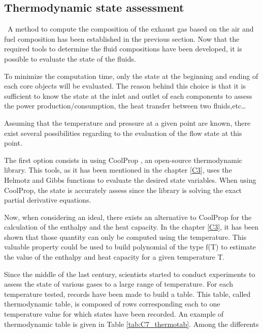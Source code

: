 \subsection{Thermodynamic state assessment}
\quad\ A method to compute the composition of the exhaust gas based on the air and fuel composition has been established in the previous section. Now that the required tools to determine the fluid compositions have been developed, it is possible to evaluate the state of the fluids. 

To minimize the computation time, only the state at the beginning and ending of each core objects will be evaluated. The reason behind this choice is that it is sufficient to know the state at the inlet and outlet of each components to assess the power production/consumption, the heat transfer between two fluids,etc\dots

Assuming that the temperature and pressure at a given point are known, there exist several possibilities regarding to the evaluation of the flow state at this point. 

The first option consists in using CoolProp \cite{Bell2014}, an open-source thermodynamic library. This tools, as it has been mentioned in the chapter \ref{C3}, uses the Helmotz and Gibbs functions to evaluate the desired state variables. When using CoolProp, the state is accurately assess since the library is solving the exact partial derivative equations. 

Now, when considering an ideal, there exists an alternative to CoolProp for the calculation of the enthalpy and the heat capacity. In the chapter \ref{C3}, it has been shown that those quantity can only be computed using the temperature. This valuable property could be used to build polynomial of the type f(T) to estimate the value of the enthalpy and heat capacity for a given temperature T. 

Since the middle of the last century, scientists started to conduct experiments to assess the state of various gases to a large range of temperature. For each temperature tested, records have been made to build a table. This table, called thermodynamic table, is composed of rows corresponding each to one temperature value for which states have been recorded. 
An example of thermodynamic table is given in Table \ref{tab:C7_thermotab}.
Among the differents 